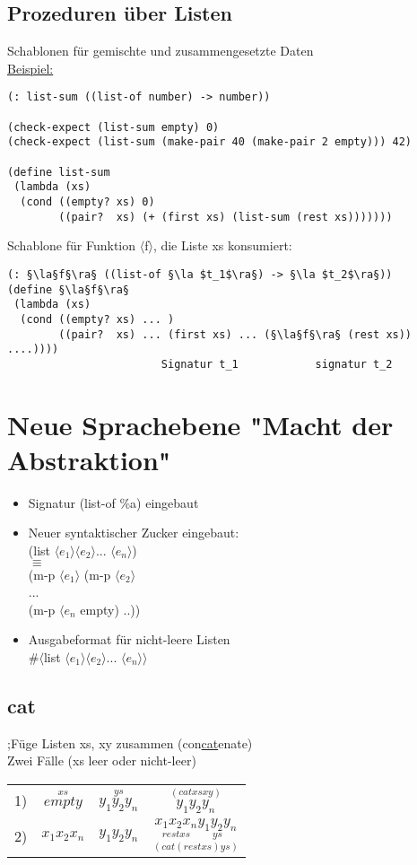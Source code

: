 \documentclass[a4paper,12pt]{article}
\newcommand{\la}{$\langle$}
\newcommand{\ra}{$\rangle$}
\begin{document}


\newpage

\subsection{Prozeduren über Listen}
Schablonen für gemischte und zusammengesetzte Daten\\
\uline{Beispiel:}
\begin{lstlisting}[style=customc]
(: list-sum ((list-of number) -> number))

(check-expect (list-sum empty) 0)
(check-expect (list-sum (make-pair 40 (make-pair 2 empty))) 42)

(define list-sum
 (lambda (xs)
  (cond ((empty? xs) 0)
        ((pair?  xs) (+ (first xs) (list-sum (rest xs)))))))
\end{lstlisting}
Schablone für Funktion \la f\ra, die Liste xs konsumiert:
\begin{lstlisting}[style=customc]
(: §\la§f§\ra§ ((list-of §\la $t_1$\ra§) -> §\la $t_2$\ra§))
(define §\la§f§\ra§
 (lambda (xs)
  (cond ((empty? xs) ... )
        ((pair?  xs) ... (first xs) ... (§\la§f§\ra§ (rest xs)) ....))))
					    Signatur t_1			signatur t_2
\end{lstlisting}

\section{Neue Sprachebene "Macht der Abstraktion"}
\begin{itemize}
\item Signatur (list-of \%a) eingebaut 
\item Neuer syntaktischer Zucker eingebaut: \\
 (list \la$e_1$\ra \la$e_2$\ra ... \la$e_n$\ra)\\
 $\equiv$\\
 (m-p \la$e_1$\ra
			 (m-p \la$e_2$\ra\\
			 ...\\
			 (m-p \la$e_n$ empty) ..))\\
\item Ausgabeformat für nicht-leere Listen \\
\#\la list \la$e_1$\ra \la$e_2$\ra ... \la$e_n$\ra\ra
\end{itemize}

\subsection{cat}
;Füge Listen xs, xy zusammen (con\uline{cat}enate)\\
Zwei Fälle (xs leer oder nicht-leer)\\
\begin{tabular}{lccc}
1) & $\overset{xs}{empty}$ & $\overset{ys}{y_1 y_2 y_n}$  & $\overset{(cat xs xy)}{y_1 y_2 y_n}$\\
2) &  $x_1 x_2 x_n$  &          $y_1 y_2 y_n$ &				$\underset{(cat (rest xs) ys)}{	\underset{rest xs}{x_1 x_2    x_n}    \underset{ys}{y_1 y_2   y_n}}$
\end{tabular}
\end{document}
